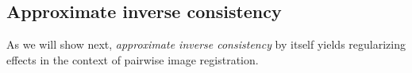 \documentclass[10pt,twocolumn,letterpaper]{article} %
\begin{document}

\subsection{Approximate inverse consistency} 
\label{subsec:h1_by_approximate_inverse_consistency}

As we will show next, \emph{approximate inverse consistency} by itself yields regularizing effects in the context of pairwise image registration.
\end{document}
